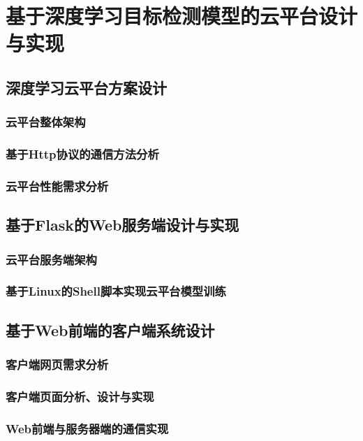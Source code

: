 \chapter{基于深度学习目标检测模型的云平台设计与实现}

\section{深度学习云平台方案设计}

\subsection{云平台整体架构}

\subsection{基于Http协议的通信方法分析}

\subsection{云平台性能需求分析}

\section{基于Flask的Web服务端设计与实现}

\subsection{云平台服务端架构}

\subsection{基于Linux的Shell脚本实现云平台模型训练}

\section{基于Web前端的客户端系统设计}

\subsection{客户端网页需求分析}

\subsection{客户端页面分析、设计与实现}

\subsection{Web前端与服务器端的通信实现}


